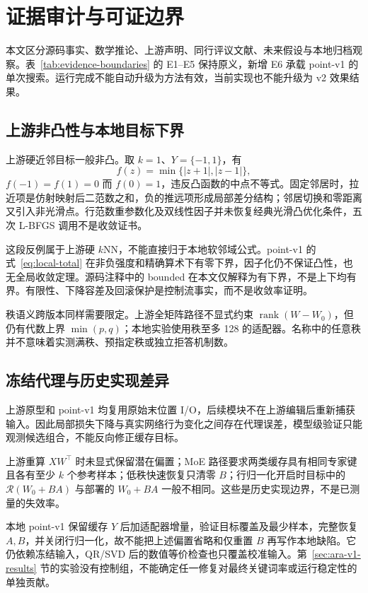 \section{证据审计与可证边界}
\label{sec:evidence-audit}

本文区分源码事实、数学推论、上游声明、同行评议文献、未来假设与本地归档观察。表~\ref{tab:evidence-boundaries} 的 E1--E5 保持原义，新增 E6 承载 point-v1 的单次搜索。运行完成不能自动升级为方法有效，当前实现也不能升级为 v2 效果结果。

\subsection{上游非凸性与本地目标下界}

上游硬近邻目标一般非凸。取 $k=1$、$Y=\{-1,1\}$，有
\begin{equation}
 f(z)=\min\{|z+1|,|z-1|\},
\end{equation}
$f(-1)=f(1)=0$ 而 $f(0)=1$，违反凸函数的中点不等式。固定邻居时，拉近项是仿射映射后二范数之和，负的推远项形成局部差分结构；邻居切换和零距离又引入非光滑点。行范数重参数化及双线性因子并未恢复经典光滑凸优化条件，五次 L-BFGS 调用不是收敛证书\cite{ara2026source}。

这段反例属于上游硬 $k$NN，不能直接归于本地软邻域公式。point-v1 的式~\eqref{eq:local-total} 在非负强度和精确算术下有零下界，因子化仍不保证凸性，也无全局收敛定理。源码注释中的 bounded 在本文仅解释为有下界，不是上下均有界。有限性、下降容差及回滚保护是控制流事实，而不是收敛率证明。

秩语义跨版本同样需要限定。上游全矩阵路径不显式约束 $\operatorname{rank}(W-W_0)$，但仍有代数上界 $\min(p,q)$；本地实验使用秩至多 128 的适配器。名称中的任意秩并不意味着实测满秩、预指定秩或独立拒答机制数。

\subsection{冻结代理与历史实现差异}

上游原型和 point-v1 均复用原始末位置 I/O，后续模块不在上游编辑后重新捕获输入。因此局部损失下降与真实网络行为变化之间存在代理误差，模型级验证只能观测候选组合，不能反向修正缓存目标。

上游重算 $XW^\top$ 时未显式保留潜在偏置；MoE 路径要求两类缓存具有相同专家键且各有至少 $k$ 个参考样本；低秩快速恢复只清零 $B$；行归一化开启时目标中的 $\mathcal R(W_0+BA)$ 与部署的 $W_0+BA$ 一般不相同。这些是历史实现边界，不是已测量的失效率\cite{ara2026source}。

本地 point-v1 保留缓存 $Y$ 后加适配器增量，验证目标覆盖及最少样本，完整恢复 $A,B$，并关闭行归一化，故不能把上述偏置省略和仅重置 $B$ 再写作本地缺陷。它仍依赖冻结输入，QR/SVD 后的数值等价检查也只覆盖校准输入。第~\ref{sec:ara-v1-results} 节的实验没有控制组，不能确定任一修复对最终关键词率或运行稳定性的单独贡献。

